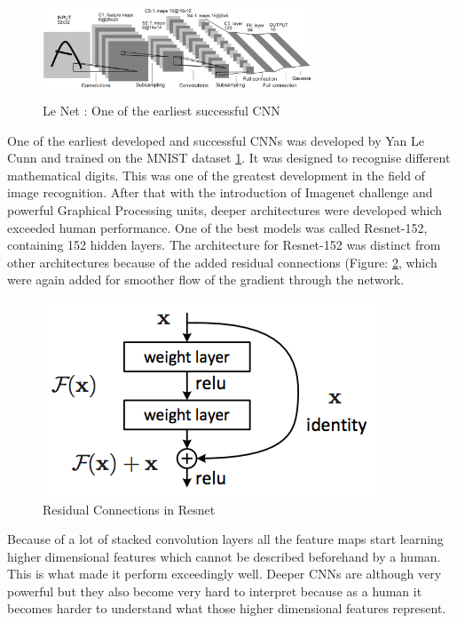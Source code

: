 \documentclass[letterpaper, 12 pt, conference]{ieeeconf}  %
\begin{document}
\begin{figure}[!h]
\centering
\includegraphics[width=8cm,height=3cm]{../figs/cnn/le_net.png}	
\caption{Le Net \cite{le_net}: One of the earliest successful CNN}
\label{fig:Le_Net_Arch} 
\end{figure}

One of the earliest developed and successful CNNs was developed by Yan Le Cunn \cite{le_net} and trained on the MNIST dataset \ref{fig:Le_Net_Arch}. It was designed to recognise different mathematical digits. This was one of the greatest development in the field of image recognition. After that with the introduction of Imagenet challenge \cite{ilsvrc} and powerful Graphical Processing units, deeper architectures were developed which exceeded human performance. One of the best models was called Resnet-152, containing 152 hidden layers. The architecture for Resnet-152 was distinct from other architectures because of the added residual connections (Figure: \ref{fig:Resnet_Residual_Arch}, which were again added for smoother flow of the gradient through the network.

\begin{figure}[!h]
\centering
\includegraphics[scale=0.30]{../figs/cnn/resnet_residual.png}	
\caption{Residual Connections in Resnet}
\label{fig:Resnet_Residual_Arch} 
\end{figure}

Because of a lot of stacked convolution layers all the feature maps start learning higher dimensional features which cannot be described beforehand by a human. This is what made it perform exceedingly well. Deeper CNNs are although very powerful but they also become very hard to interpret because as a human it becomes harder to understand what those higher dimensional features represent.
\end{document}
